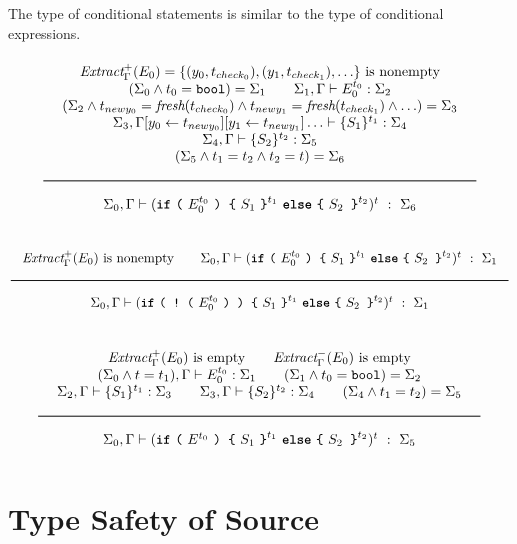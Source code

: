 \noindent
The type of conditional statements is similar to the type of conditional expressions.
\[
  \Rule{
  \begin{array}{c}
  \ExtractPos_\Gamma(E_0) = \{ (y_0, t_{check_0}), (y_1, t_{check_1}), \ldots \}
  \text{ is nonempty}
  \\
  (\Sigma_0
  \wedge t_0 = \Bool
  ) = \Sigma_1
  \qquad
  \Sigma_1, \Gamma \vdash E_0^{t_0} : \Sigma_2
  \\
  (\Sigma_2
  \wedge t_{newy_0} = \textit{fresh}(t_{check_0})
  \wedge t_{newy_1} = \textit{fresh}(t_{check_1})
  \wedge \ldots
  ) = \Sigma_3
  \\
  \Sigma_3, \Gamma [ y_0 \leftarrow t_{newy_0} ][ y_1 \leftarrow t_{newy_1} ]\ldots \vdash \{S_1\}^{t_1} : \Sigma_4
  \\
  \Sigma_4, \Gamma \vdash \{S_2\}^{t_2} : \Sigma_5
  \\
  (\Sigma_5 \wedge t_1 = t_2 \wedge t_2 = t) = \Sigma_{6}
  \end{array}
  }{
  \Sigma_0, \Gamma \vdash (\If\ \texttt{(}\ E_0^{t_0}\ \texttt{)\ \{}\ S_1\ \texttt{\}}^{t_1}\ \Else\ \texttt{\{}\ S_2\texttt{ \}}^{t_2})^t\ :\ \Sigma_6}
\]

\[
\Rule{
  \ExtractPos_\Gamma(E_0) \text{ is nonempty}
  \qquad
  \Sigma_0, \Gamma \vdash (\If\ \texttt{(}\ E_0^{t_0}\ \texttt{) \{}\ S_1\ \texttt{\}}^{t_1}\ \Else\ \texttt{\{}\ S_2\texttt{ \}}^{t_2})^t\ :\ \Sigma_1
}{
  \Sigma_0, \Gamma \vdash (\If\ \texttt{(\ !\ (}\ E_0^{t_0}\ \texttt{)\ )\ \{}\ S_1\ \texttt{\}}^{t_1}\ \Else\ \texttt{\{}\ S_2\texttt{ \}}^{t_2})^t\ :\ \Sigma_1
}
\]

\[
\Rule
{
  \begin{array}{c}
  \ExtractPos_\Gamma(E_0) \text{ is empty}
  \qquad
  \ExtractNeg_\Gamma(E_0) \text{ is empty}
  \\
  (\Sigma_0 \wedge t = t_1), \Gamma \vdash E_0^{t_0} : \Sigma_1 \qquad
  (\Sigma_1 \wedge t_0 = \Bool) = \Sigma_2
  \\
  \Sigma_2, \Gamma \vdash \{S_1\}^{t_1} : \Sigma_3 \qquad
  \Sigma_3, \Gamma \vdash \{S_2\}^{t_2} : \Sigma_4 \qquad
  (\Sigma_4 \wedge t_1 = t_2) = \Sigma_5
  \end{array}
}{
  \Sigma_0, \Gamma \vdash (\If\ \texttt{(}\ E^{t_0}\ \texttt{)\ \{}\ S_1\ \texttt{\}}^{t_1}\ \Else\ \texttt{\{}\ S_2\texttt{ \}}^{t_2})^t\ :\ \Sigma_5
}
\]


\section{Type Safety of Source}
\label{simplsafe}


